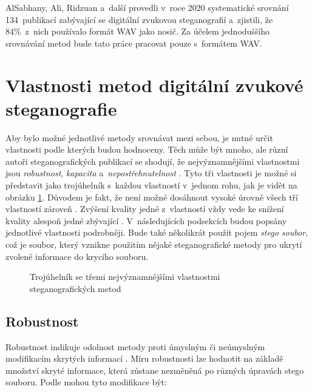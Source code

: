 AlSabhany, Ali, Ridzuan a~další \cite{AlSabhany2020} provedli v~roce 2020
systematické srovnání 134~publikací zabývající se digitální zvukovou
steganografií a~zjistili, že 84\%~z~nich používalo formát WAV jako nosič. Za
účelem jednoduššího srovnávání metod bude tato práce pracovat pouze s~formátem
WAV.

\section{Vlastnosti metod digitální zvukové steganografie}
\label{sec:method-properties}

Aby bylo možné jednotlivé metody srovnávat mezi sebou, je nutné určit
vlastnosti podle kterých budou hodnoceny. Těch může být mnoho, ale různí autoři
steganografických publikací se shodují, že nejvýznamnějšími vlastnostmi jsou
\textit{robustnost}, \textit{kapacita} a~\textit{nepostřehnutelnost}
\cite{AlSabhany2020}\cite{Djebbar2012}\cite{Dutta2020}. Tyto tři vlastnosti je
možné si představit jako trojúhelník s~každou vlastností v~jednom rohu, jak je
vidět na obrázku \ref{pic:method-property-triangle}. Důvodem je fakt, že není
možné dosáhnout vysoké úrovně všech tří vlastností zároveň \cite{Dutta2020}.
Zvýšení kvality jedné z~vlastností vždy vede ke snížení kvality alespoň jedné
zbývající \cite{AlSabhany2020}\cite{Djebbar2012}. V~následujících podsekcích
budou popsány jednotlivé vlastnosti podrobněji. Bude také několikrát použit
pojem \textit{stego soubor}, což je soubor, který vznikne použitím nějaké
steganografické metody pro ukrytí zvolené informace do krycího souboru.

\begin{figure}[hbt]
    \centering
    \caption{Trojúhelník se třemi nejvýznamnějšími vlastnostmi
    steganografických metod}
    \label{pic:method-property-triangle}
\end{figure}

\subsection*{Robustnost}
\label{sub:robustness}

Robustnost indikuje odolnost metody proti úmyslným či neúmyslným modifikacím
skrytých informací \cite{AlSabhany2020}\cite{Dutta2020}. Míru robustnosti lze
hodnotit na základě množství skryté informace, která zůstane nezměněná po
různých úpravách stego souboru. Podle \cite{Djebbar2012} mohou tyto modifikace
být:

